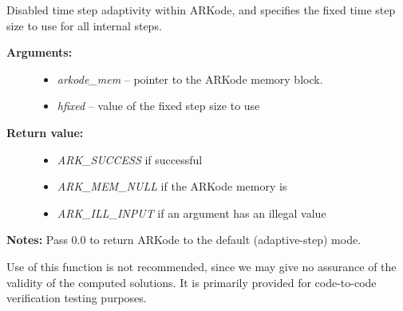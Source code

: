 \documentclass[letterpaper,10pt,english]{sphinxmanual}
\begin{document}
\begin{fulllineitems}
\label{c_interface/User_callable:c.ARKodeSetFixedStep}
Disabled time step adaptivity within ARKode, and specifies the
fixed time step size to use for all internal steps.
\begin{description}
\item[{\textbf{Arguments:}}] \leavevmode\begin{itemize}
\item {} 
\emph{arkode\_mem} -- pointer to the ARKode memory block.

\item {} 
\emph{hfixed} -- value of the fixed step size to use

\end{itemize}

\item[{\textbf{Return value:}}] \leavevmode\begin{itemize}
\item {} 
\emph{ARK\_SUCCESS} if successful

\item {} 
\emph{ARK\_MEM\_NULL} if the ARKode memory is 

\item {} 
\emph{ARK\_ILL\_INPUT} if an argument has an illegal value

\end{itemize}

\end{description}

\textbf{Notes:} Pass 0.0 to return ARKode to the default (adaptive-step) mode.

Use of this function is not recommended, since we may give no
assurance of the validity of the computed solutions.  It is
primarily provided for code-to-code verification testing purposes.


\end{fulllineitems}
\end{document}
